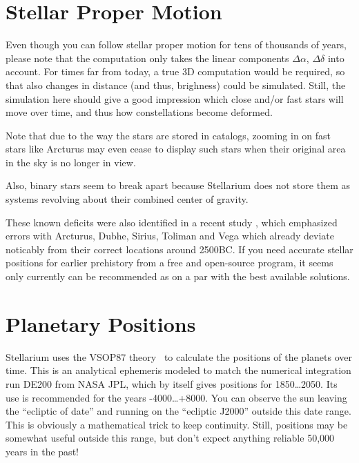 \section{Stellar Proper Motion}
\label{sec:Accuracy:ProperMotion}

Even though you can follow stellar proper motion for tens of thousands of years, 
please note that the computation only takes the linear components $\Delta\alpha$, $\Delta\delta$ into account. 
For times far from today, a true 3D computation would be required, 
so that also changes in distance (and thus, brighness) could be simulated. 
Still, the simulation here should give a good impression which close and/or fast stars 
will move over time, and thus how constellations become deformed.

Note that due to the way the stars are stored in catalogs, zooming in on fast stars like Arcturus 
may even cease to display such stars when their original area in the sky is no longer in view.

Also, binary stars seem to break apart because Stellarium does not store them as systems 
revolving about their combined center of gravity.

These known deficits were also identified in a recent study
\citep{deLorenzis:2018}, which emphasized errors with Arcturus, Dubhe,
Sirius, Toliman and Vega which already deviate noticably from their
correct locations around 2500BC.  If you need accurate stellar
positions for earlier prehistory from a free and open-source program,
it seems only  currently can be recommended as
on a par with the best available solutions.


\section{Planetary Positions}
\label{sec:Accuracy:Planets}

Stellarium uses the VSOP87 theory~\citep{1988A&A...202..309B} %
to calculate the positions of the planets over time.
This is an analytical ephemeris modeled to match the numerical
integration run DE200 from NASA JPL, which by itself gives positions for 1850\ldots2050. 
Its use is recommended for the years -4000\ldots+8000. You can observe the sun leaving the ``ecliptic
of date'' and running on the ``ecliptic J2000'' outside this date
range. This is obviously a mathematical trick to keep
continuity. Still, positions may be somewhat useful outside this
range, but don't expect anything reliable 50,000 years in the past! 

